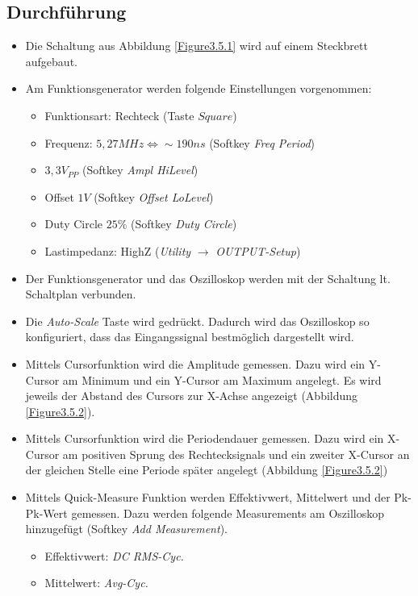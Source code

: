 \documentclass[12pt,a4paper,titlepage]{article}
\begin{document}
\subsection{Durchf\"uhrung}
\begin{itemize}
  \item Die Schaltung aus Abbildung \ref{Figure3.5.1} wird auf einem Steckbrett aufgebaut.
  \item Am Funktionsgenerator werden folgende Einstellungen vorgenommen:
    \begin{itemize}
      \item Funktionsart: Rechteck (Taste $Square$)
      \item Frequenz: $5,27 MHz \Leftrightarrow \sim190 ns$ (Softkey \textit{Freq Period})
      \item $3,3 V_{PP}$ (Softkey \textit{Ampl HiLevel})
      \item Offset $1 V$ (Softkey \textit{Offset LoLevel})
      \item Duty Circle $25 \%$ (Softkey \textit{Duty Circle})
      \item Lastimpedanz: HighZ (\textit{Utility} $\rightarrow$ \textit{OUTPUT-Setup})
    \end{itemize}
  \item Der Funktionsgenerator und das Oszilloskop werden mit der Schaltung lt. Schaltplan verbunden.
  \item Die \textit{Auto-Scale} Taste wird gedr\"uckt. Dadurch wird das Oszilloskop so konfiguriert, dass das Eingangssignal bestm\"oglich dargestellt wird.
  \item Mittels Cursorfunktion wird die Amplitude gemessen. Dazu wird ein Y-Cursor am Minimum und ein Y-Cursor am Maximum angelegt. Es wird jeweils der Abstand des Cursors zur X-Achse angezeigt (Abbildung \ref{Figure3.5.2}).
  \item Mittels Cursorfunktion wird die Periodendauer gemessen. Dazu wird ein X-Cursor am positiven Sprung des Rechtecksignals und ein zweiter X-Cursor an der gleichen Stelle eine Periode sp\"ater angelegt (Abbildung \ref{Figure3.5.2})
  \item Mittels Quick-Measure Funktion werden Effektivwert, Mittelwert und der Pk-Pk-Wert gemessen. Dazu werden folgende Measurements am Oszilloskop hinzugef\"ugt (Softkey \textit{Add Measurement}).
    \begin{itemize}
      \item Effektivwert: \textit{DC RMS-Cyc.}
      \item Mittelwert: \textit{Avg-Cyc.}

\end{itemize}
\end{itemize}
\end{document}
